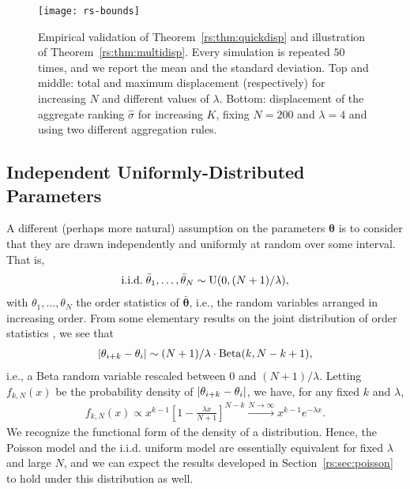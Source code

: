 \begin{figure}[p]
\centering
\texttt{[image: rs-bounds]}
\caption{
Empirical validation of Theorem~\ref{rs:thm:quickdisp} and illustration of Theorem~\ref{rs:thm:multidisp}.
Every simulation is repeated $50$ times, and we report the mean and the standard deviation.
Top and middle: total and maximum displacement (respectively) for increasing $N$ and different values of $\lambda$.
Bottom: displacement of the aggregate ranking $\hat{\sigma}$ for increasing $K$, fixing $N = \num{200}$ and $\lambda = \num{4}$ and using two different aggregation rules.
}
\label{rs:fig:bounds}
\end{figure}


\subsection{Independent Uniformly-Distributed Parameters}
\label{rs:sec:iidunif}

A different (perhaps more natural) assumption on the parameters $\bm{\theta}$ is to consider that they are drawn independently and uniformly at random over some interval.
That is,
\begin{align*}
\text{i.i.d.}\; \bar{\theta}_1, \ldots, \bar{\theta}_N \sim \mathrm{U}( 0, (N+1) / \lambda ),
\end{align*}
with $\theta_1, \ldots, \theta_N$ the order statistics of $\bar{\bm{\theta}}$, i.e., the random variables arranged in increasing order.
From some elementary results on the joint distribution of order statistics \citep[see, e.g.,][]{arnold2008first}, we see that
\begin{align*}
\lvert\theta_{i+k} - \theta_{i}\rvert \sim (N+1) / \lambda \cdot \mathrm{Beta}( k, N - k + 1 ),
\end{align*}
i.e., a Beta random variable rescaled between $0$ and $(N+1) / \lambda$.
Letting $f_{k,N}(x)$ be the probability density of $\lvert\theta_{i+k} - \theta_{i}\rvert$, we have, for any fixed $k$ and $\lambda$,
\begin{align*}
f_{k,N}(x) \propto x^{k-1} \left[ 1 - \frac{\lambda x}{N + 1} \right]^{N - k} \xrightarrow{N \to \infty} x^{k-1} e^{-\lambda x}.
\end{align*}
We recognize the functional form of the density of a  distribution.
Hence, the Poisson model and the i.i.d. uniform model are essentially equivalent for fixed $\lambda$ and large $N$, and we can expect the results developed in Section~\ref{rs:sec:poisson} to hold under this distribution as well.
